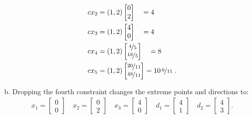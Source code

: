 \documentclass[12pt]{amsart}
\begin{document}
\begin{enumerate}[a.]
\begin{align*}
		cx_2 &= (1,2)\begin{bmatrix} 0 \\ 2 \end{bmatrix} \quad  = 4 \\
		cx_3 &= (1,2)\begin{bmatrix} 4 \\ 0 \end{bmatrix} \quad  = 4 \\
		cx_4 &= (1,2)\begin{bmatrix} \nicefrac{4}{5} \\ \nicefrac{18}{5} \end{bmatrix} \quad = 8 \\
		cx_5 &= (1,2)\begin{bmatrix}\nicefrac{20}{11}\\ \nicefrac{48}{11} \end{bmatrix} = 10 \,\nicefrac{6}{11} \ . 
	\end{align*}
	
	\item 
	Dropping the fourth constraint changes the extreme points and directions to:
	\begin{align*}
		x_1 = \begin{bmatrix} 0 \\ 0 \end{bmatrix} \quad
		x_2 = \begin{bmatrix} 0 \\ 2 \end{bmatrix} \quad
		x_3 = \begin{bmatrix} 4 \\ 0 \end{bmatrix} \quad
		d_1 = \begin{bmatrix} 4 \\ 1 \end{bmatrix} \quad
		d_2 = \begin{bmatrix} 4 \\ 3 \end{bmatrix}.
	\end{align*}


\end{enumerate}
\end{document}
